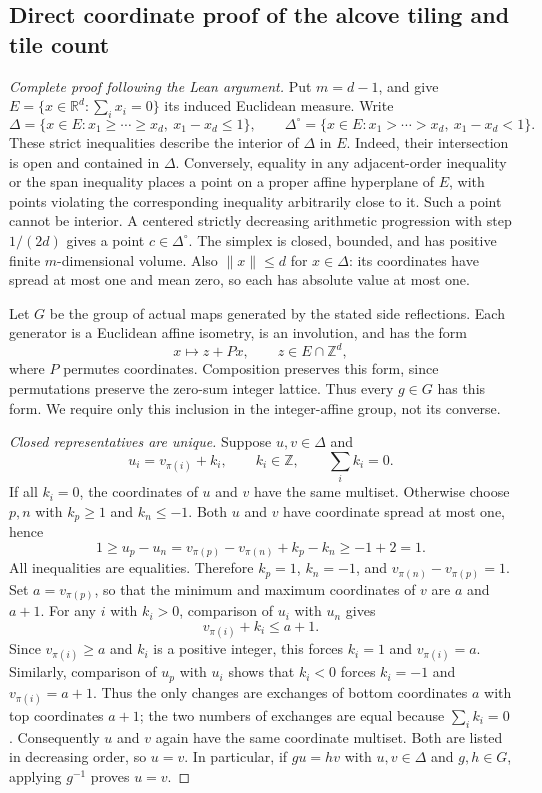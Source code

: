 
\subsection{Direct coordinate proof of the alcove tiling and tile count}
\label{leanproof:ANT-3-4}
\begin{proof}[Complete proof following the Lean argument]
Put \(m=d-1\), and give \(E=\{x\in\mathbb R^d:\sum_i x_i=0\}\)
its induced Euclidean measure. Write
\[
 \Delta=\{x\in E:x_1\ge\cdots\ge x_d,\ x_1-x_d\le1\},
 \qquad
 \Delta^\circ=\{x\in E:x_1>\cdots>x_d,\ x_1-x_d<1\}.
\]
These strict inequalities describe the interior of \(\Delta\) in \(E\).
Indeed, their intersection is open and contained in \(\Delta\).
Conversely, equality in any adjacent-order inequality or the span inequality
places a point on a proper affine hyperplane of \(E\), with points violating
the corresponding inequality arbitrarily close to it. Such a point cannot
be interior. A centered strictly decreasing arithmetic progression with step
\(1/(2d)\) gives a point \(c\in\Delta^\circ\). The simplex is closed,
bounded, and has positive finite \(m\)-dimensional volume.
Also \(\|x\|\le d\) for \(x\in\Delta\): its coordinates have spread at most
one and mean zero, so each has absolute value at most one.

Let \(G\) be the group of actual maps generated by the stated side reflections.
Each generator is a Euclidean affine isometry, is an involution, and has
the form
\[
             x\longmapsto z+P x,
 \qquad z\in E\cap\mathbb Z^d,
\]
where \(P\) permutes coordinates. Composition preserves this form, since
permutations preserve the zero-sum integer lattice. Thus every \(g\in G\)
has this form. We require only this inclusion in the integer-affine group,
not its converse.

\emph{Closed representatives are unique.}
Suppose \(u,v\in\Delta\) and
\[
             u_i=v_{\pi(i)}+k_i,\qquad
             k_i\in\mathbb Z,\qquad \sum_i k_i=0.
\]
If all \(k_i=0\), the coordinates of \(u\) and \(v\) have the same multiset.
Otherwise choose \(p,n\) with \(k_p\ge1\) and \(k_n\le-1\).
Both \(u\) and \(v\) have coordinate spread at most one, hence
\[
  1\ge u_p-u_n
     =v_{\pi(p)}-v_{\pi(n)}+k_p-k_n
     \ge-1+2=1.
\]
All inequalities are equalities. Therefore \(k_p=1\), \(k_n=-1\), and
\(v_{\pi(n)}-v_{\pi(p)}=1\). Set \(a=v_{\pi(p)}\), so that the minimum
and maximum coordinates of \(v\) are \(a\) and \(a+1\).
For any \(i\) with \(k_i>0\), comparison of \(u_i\) with \(u_n\) gives
\[
             v_{\pi(i)}+k_i\le a+1.
\]
Since \(v_{\pi(i)}\ge a\) and \(k_i\) is a positive integer, this forces
\(k_i=1\) and \(v_{\pi(i)}=a\).
Similarly, comparison of \(u_p\) with \(u_i\) shows that \(k_i<0\)
forces \(k_i=-1\) and \(v_{\pi(i)}=a+1\).
Thus the only changes are exchanges of bottom coordinates \(a\) with top
coordinates \(a+1\); the two numbers of exchanges are equal because
\(\sum_i k_i=0\). Consequently \(u\) and \(v\) again have the same
coordinate multiset. Both are listed in decreasing order, so \(u=v\).
In particular, if \(g u=h v\) with \(u,v\in\Delta\) and \(g,h\in G\),
applying \(g^{-1}\) proves \(u=v\).


\end{proof}
